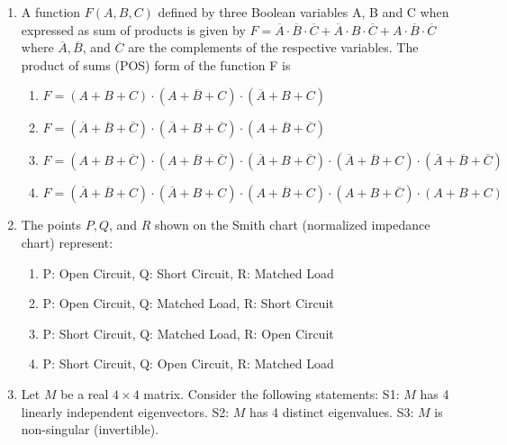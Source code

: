 \documentclass{article}
\begin{document}
\begin{enumerate}
\item A function $F(A, B, C)$ defined by three Boolean variables A, B and C when expressed as sum of products is given by
$F = \overline{A} \cdot \overline{B} \cdot \overline{C} + \overline{A} \cdot B \cdot \overline{C} + A \cdot \overline{B} \cdot \overline{C}$
where $\overline{A}, \overline{B}$, and $\overline{C}$ are the complements of the respective variables. The product of sums (POS) form of the function F is
\begin{enumerate}
\item $F = (A + B + C) \cdot (A + \overline{B} + C) \cdot (\overline{A} + B + C)$
\item $F = (\overline{A} + \overline{B} + \overline{C}) \cdot (\overline{A} + B + \overline{C}) \cdot (A + \overline{B} + \overline{C})$
\item $F = (A + B + \overline{C}) \cdot (A + \overline{B} + \overline{C}) \cdot (\overline{A} + B + \overline{C}) \cdot (\overline{A} + \overline{B} + C) \cdot (\overline{A} + \overline{B} + \overline{C})$
\item $F = (\overline{A} + \overline{B} + C) \cdot (\overline{A} + B + C) \cdot (A + \overline{B} + C) \cdot (A + B + \overline{C}) \cdot (A + B + C)$
\end{enumerate}

\item The points $P, Q$, and $R$ shown on the Smith chart (normalized impedance chart) represent:
\begin{figure}[H]
    \centering
    
    \caption{}
    \label{fig:q20}
\end{figure}
\begin{multicols}{2}
\begin{enumerate}
\item P: Open Circuit, Q: Short Circuit, R: Matched Load
\item P: Open Circuit, Q: Matched Load, R: Short Circuit
\item P: Short Circuit, Q: Matched Load, R: Open Circuit
\item P: Short Circuit, Q: Open Circuit, R: Matched Load
\end{enumerate}
\end{multicols}

\item Let $M$ be a real $4 \times 4$ matrix. Consider the following statements:
S1: $M$ has 4 linearly independent eigenvectors.
S2: $M$ has 4 distinct eigenvalues.
S3: $M$ is non-singular (invertible).


\end{enumerate}
\end{document}
